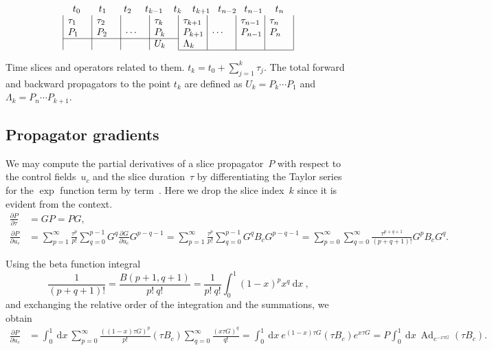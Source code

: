 \documentclass[aps, pra, a4paper, longbibliography, superscriptaddress]{revtex4-1}
\newcommand{\be}{\begin{equation}}
\newcommand{\ee}{\end{equation}}
\DeclareMathOperator{\Ad}{Ad}
\newcommand{\dd}[2]{\frac{\partial #1}{\partial #2}}
\newcommand{\wrt}[1]{\:\mathrm{d}#1\:} %
\begin{document}
\begin{table}[h]
\[
\begin{array}{c}
\begin{array}{@{t_0}p{1.9em}@{t_1}p{1.8em}@{t_2}p{1.4em}@{t_{k-1}}p{1.1em}@{t_{k}}p{1.1em}@{t_{k+1}}p{0.8em}@{t_{n-2}}p{0.8em}@{t_{n-1}}p{1.3em}@{t_n}}
& & & & & & &
\end{array}\\
\begin{array}{|p{2em}|p{2em}|p{2em}|p{2em}|p{2em}|p{2em}|p{2em}|p{2em}|}
 $\tau_1$ & $\tau_2$ & & $\tau_k$ & $\tau_{k+1}$ & & $\tau_{n-1}$ & $\tau_n$ \\
 $P_1$ & $P_2$ & $\cdots$ & $P_k$ & $P_{k+1}$ & $\cdots$ & $P_{n-1}$ & $P_n$ \\
\cline{1-4}
& & & $U_{k}$ & $\Lambda_{k}$ & & & \\
\cline{5-8}
\end{array}
\end{array}
\]
\caption{Time slices and operators related to them.
$t_k = t_0 + \sum_{j=1}^{k} \tau_j$.
The total forward and backward
propagators to the point $t_k$ are defined as
$U_k = P_k \cdots P_1$ and
$\Lambda_k = P_{n} \cdots P_{k+1}$.
\label{table:slices}
}
\end{table}


\subsection{Propagator gradients}

We may compute the partial derivatives of a slice propagator~$P$ with
respect to the control fields~$u_c$ and the slice duration~$\tau$ by
differentiating the Taylor series for the $\exp$ function term by
term~\cite{Najfeld1995,deFouquieres2011}.
Here we drop the slice index~$k$ since it is evident from the context.
\begin{align}
\dd{P}{\tau}  &= G P = P G,\\
\dd{P}{u_{c}}
&=
\sum_{p=1}^{\infty} \frac{\tau^p}{p!}
\sum_{q=0}^{p-1}
G^{q} \dd{G}{u_{c}} G^{p-q-1}
=
\sum_{p=1}^{\infty} \frac{\tau^p}{p!}
\sum_{q=0}^{p-1}
G^{q} B_c G^{p-q-1}
=
\sum_{p=0}^\infty \sum_{q=0}^\infty
\frac{\tau^{p+q+1}}{(p+q+1)!}
G^{p} B_c G^{q}.
\end{align}

Using the beta function integral
\be
\frac{1}{(p+q+1)!} = \frac{B(p+1, q+1)}{p! \: q!} = \frac{1}{p! \: q!} \int_0^1 (1-x)^p x^q \wrt{x},
\ee
and exchanging the relative order of the integration and the summations,
we obtain
\begin{align}
\label{eq:dPdu}
\dd{P}{u_{c}}
&=
\int_0^1 \wrt{x}
\sum_{p=0}^\infty 
\frac{((1-x)\tau G)^{p}}{p!}
(\tau B_c)
\sum_{q=0}^\infty
\frac{(x \tau G)^{q}}{q!}
=
\int_0^1 \wrt{x}
e^{(1-x)\tau G}
(\tau B_c)
e^{x \tau G}
=
P
\int_0^1 \wrt{x}
\Ad_{e^{-x\tau G}}
(\tau B_c).
\end{align}
\end{document}
